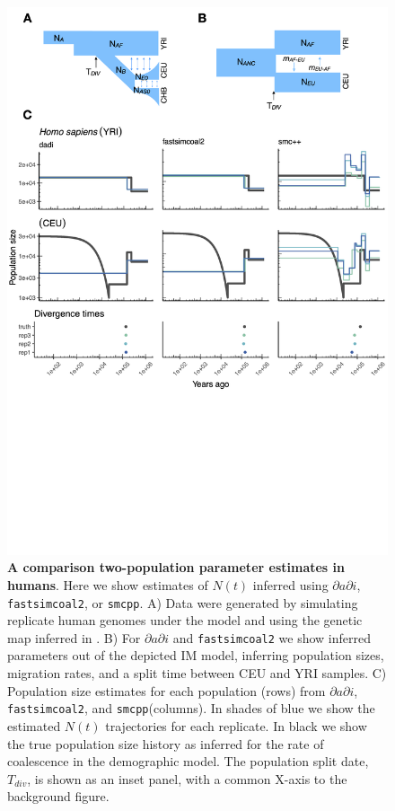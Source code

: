 \documentclass[12pt,halfline,a4paper]{ouparticle}
\newcommand{\dadi}{$\partial a \partial i$\xspace}
\newcommand{\smcpp}{\texttt{smcpp}\xspace}
\begin{document}
\begin{figure}
\begin{center}
\includegraphics[width=0.7\linewidth]{display_items/homo_sapiens_two_popn_comp.png}
\caption{\textbf{A comparison two-population parameter estimates in humans}. Here we show estimates of $N(t)$ inferred using \dadi, \texttt{fastsimcoal2}, or \smcpp.
A) Data were generated by simulating
replicate human genomes under the \cite{gutenkunst2009inferring} model and using the genetic map
inferred in \cite{international2007second}. B) For \dadi and \texttt{fastsimcoal2} we show inferred
parameters out of the depicted IM model, inferring population sizes, migration rates, and a split
time between CEU and YRI samples. C) Population size estimates for each population (rows)
from \dadi, \texttt{fastsimcoal2}, and \smcpp (columns). In shades of blue we show the estimated
$N(t)$ trajectories for each replicate. In black we show the true population size history as inferred
for the rate of coalescence in the demographic model. The population split date, $T_{div}$, is shown as
an inset panel, with a common X-axis to the background figure.}
\label{fig:IM_popn_human}
\end{center}
\end{figure}
\end{document}
